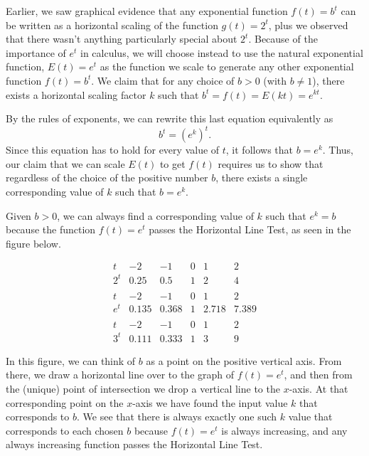 \documentclass[nooutcomes]{ximera}
\begin{document}

Earlier, we saw graphical evidence that any exponential function $f(t) = b^t$ can be written as a horizontal scaling of the function $g(t) = 2^t$, plus we observed that there wasn't anything particularly special about $2^t$.    Because of the importance of $e^t$ in calculus, we will choose instead to use the natural exponential function, 	$E(t) = e^t$ as the function we scale to generate any other exponential function $f(t) = b^t$.  We claim that for any choice of $b \gt 0$ (with $b \ne 1$), there exists a horizontal scaling factor $k$ such that $b^t = f(t) = E(kt) = e^{kt}$.

By the rules of exponents, we can rewrite this last equation equivalently as%
\begin{equation*}
b^t = (e^k)^t\text{.}
\end{equation*}
Since this equation has to hold for every value of $t$, it follows that $b = e^k$.  Thus, our claim that we can scale $E(t)$ to get $f(t)$ requires us to show that regardless of the choice of the positive number $b$, there exists a single corresponding value of $k$ such that $b = e^k$.

Given $b \gt 0$, we can always find a corresponding value of $k$ such that $e^k = b$ because the function $f(t) = e^t$ passes the Horizontal Line Test, as seen in the figure below.


$$
\begin{array}{cccccc}
t&-2&-1&0&1&2\\
\hline
2^t&0.25&0.5&1&2&4\\
&&&&\\
t&-2&-1&0&1&2\\
\hline
e^t&0.135&0.368&1&2.718&7.389\\
&&&&\\
t&-2&-1&0&1&2\\
\hline
3^t&0.111&0.333&1&3&9
\end{array}
$$

In this figure, we can think of $b$ as a point on the positive vertical axis.  From there, we draw a horizontal line over to the graph of $f(t) = e^t$, and then from the (unique) point of intersection we drop a vertical line to the $x$-axis.  At that corresponding point on the $x$-axis we have found the input value $k$ that corresponds to $b$.  We see that there is always exactly one such $k$ value that corresponds to each chosen $b$ because $f(t) = e^t$ is always increasing, and any always increasing function passes the Horizontal Line Test.
\end{document}
